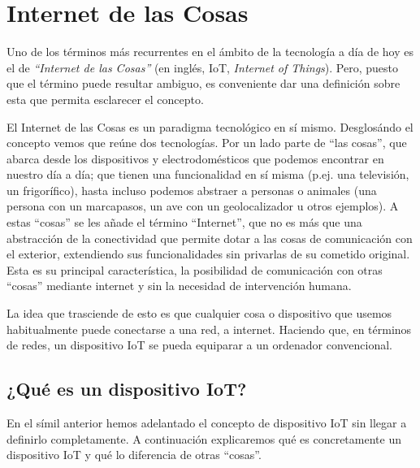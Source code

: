 \documentclass[a4paper,10pt]{article}
\begin{document}
\tableofcontents



\newpage

\section{Internet de las Cosas}\label{internet-de-las-cosas}

Uno de los términos más recurrentes en el ámbito de la tecnología a día
de hoy es el de \emph{``Internet de las Cosas''} (en inglés, IoT, \emph{Internet of
Things}). Pero, puesto que el término puede resultar ambiguo, es
conveniente dar una definición sobre esta que permita esclarecer el
concepto.

El Internet de las Cosas es un paradigma tecnológico en sí mismo.
Desglosándo el concepto vemos que reúne dos tecnologías. Por un lado
parte de ``las cosas'', que abarca desde los dispositivos y
electrodomésticos que podemos encontrar en nuestro día a día; que tienen
una funcionalidad en sí misma (p.ej. una televisión, un frigorífico),
hasta incluso podemos abstraer a personas o animales (una persona con un
marcapasos, un ave con un geolocalizador u otros ejemplos\cite{iotagendawebsiteWhatInternetThings}). A estas ``cosas'' se les añade el término
``Internet'', que no es más que una abstracción de la conectividad que
permite dotar a las cosas de comunicación con el exterior, extendiendo
sus funcionalidades sin privarlas de su cometido original. Esta es
su principal característica, la posibilidad de comunicación con otras
``cosas'' mediante internet y sin la necesidad de intervención humana.

La idea que trasciende de esto es que cualquier cosa o dispositivo que
usemos habitualmente puede conectarse a una red, a internet. Haciendo
que, en términos de redes, un dispositivo IoT se pueda equiparar a un
ordenador convencional.

\subsection{¿Qué es un dispositivo
IoT?}\label{quuxe9-es-un-dispositivo-iot}

En el símil anterior hemos adelantado el concepto de dispositivo IoT sin
llegar a definirlo completamente. A continuación explicaremos qué es
concretamente un dispositivo IoT y qué lo diferencia de otras ``cosas''.
\end{document}
